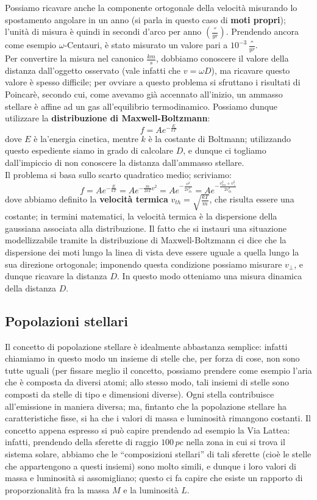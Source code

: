Possiamo ricavare anche la componente ortogonale della velocità misurando lo spostamento angolare in un anno (si parla in questo caso di \textbf{moti propri}); l'unità di misura è quindi in secondi d'arco per anno $\left(\frac{''}{yr}\right)$. Prendendo ancora come esempio $\omega$-Centauri, è stato misurato un valore pari a $10^{-3} \, \frac{''}{yr}$.\\
Per convertire la misura nel canonico $\frac{km}{s}$, dobbiamo conoscere il valore della distanza dall'oggetto osservato (vale infatti che $v=\omega D$), ma ricavare questo valore è spesso difficile; per ovviare a questo problema si sfruttano i risultati di Poincarè, secondo cui, come avevamo già accennato all'inizio, un ammasso stellare è affine ad un gas all'equilibrio termodinamico. Possiamo dunque utilizzare la \textbf{distribuzione di Maxwell-Boltzmann}:
$$f=A e^{-\frac{E}{kT}}$$
dove $E$ è la'energia cinetica, mentre $k$ è la costante di Boltmann; utilizzando questo espediente siamo in grado di calcolare $D$, e dunque ci togliamo dall'impiccio di non conoscere la distanza dall'ammasso stellare.\\
Il problema si basa sullo scarto quadratico medio; scriviamo:
$$f=A e^{-\frac{E}{kT}}=A e^{-\frac{m}{2kT} v^2}= A e^{-\frac{v^2}{2 v_{th} ^2}} = A e^{-\frac{v_{los} ^2 + v_{\perp} ^2}{2 v_{th} ^2}}$$
dove abbiamo definito la \textbf{velocità termica} $v_{th}=\sqrt{\frac{kT}{m}}$, che risulta essere una costante; in termini matematici, la velocità termica è la dispersione della gaussiana associata alla distribuzione. Il fatto che si instauri una situazione modellizzabile tramite la distribuzione di Maxwell-Boltzmann ci dice che la dispersione dei moti lungo  la linea di vista deve essere uguale a  quella lungo la sua direzione ortogonale; imponendo questa condizione possiamo misurare $v_{\perp}$, e dunque ricavare la distanza $D$. In questo modo otteniamo una misura dinamica della distanza $D$.

\subsection{Popolazioni stellari}
Il concetto di popolazione stellare è idealmente abbastanza semplice: infatti chiamiamo in questo modo un insieme di stelle che, per forza di cose, non sono tutte uguali (per fissare meglio il concetto, possiamo prendere come esempio l'aria che è composta da diversi atomi; allo stesso modo, tali insiemi di stelle sono composti da stelle di tipo e dimensioni diverse). Ogni stella contribuisce all'emissione in maniera diversa; ma, fintanto che la popolazione stellare ha caratteristiche fisse, si ha che i valori di massa e luminosità rimangono costanti. Il concetto appena espresso si può capire prendendo ad esempio la Via Lattea: infatti, prendendo della sferette di raggio $100 \, pc$ nella zona in cui si trova il sistema solare, abbiamo che le ``composizioni stellari'' di tali sferette (cioè le stelle che appartengono a questi insiemi) sono molto simili, e dunque i loro valori di massa e luminosità si assomigliano; questo ci fa capire che esiste un rapporto di proporzionalità fra la massa $M$ e la luminosità $L$.

